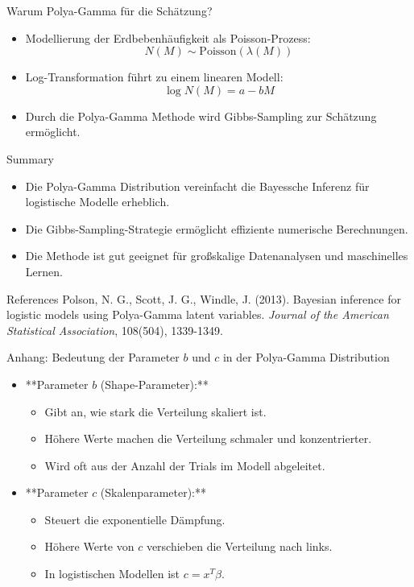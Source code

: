 \documentclass{beamer}
\begin{document}
	
	\begin{frame}{Warum Polya-Gamma für die Schätzung?}
		\begin{itemize}
			\item Modellierung der Erdbebenhäufigkeit als Poisson-Prozess:
			\[ N(M) \sim \text{Poisson}(\lambda(M)) \]
			\item Log-Transformation führt zu einem linearen Modell:
			\[ \log N(M) = a - bM \]
			\item Durch die Polya-Gamma Methode wird Gibbs-Sampling zur Schätzung ermöglicht.
		\end{itemize}
	\end{frame}
	
	
	
	
	\begin{frame}{Summary}
		\begin{itemize}
			\item Die Polya-Gamma Distribution vereinfacht die Bayessche Inferenz für logistische Modelle erheblich.
			\item Die Gibbs-Sampling-Strategie ermöglicht effiziente numerische Berechnungen.
			\item Die Methode ist gut geeignet für großskalige Datenanalysen und maschinelles Lernen.
		\end{itemize}
	\end{frame}
	




	\begin{frame}{References}
		Polson, N. G., Scott, J. G.,  Windle, J. (2013). Bayesian inference for logistic models using Polya-Gamma latent variables. \textit{Journal of the American Statistical Association}, 108(504), 1339-1349.
	\end{frame}


\begin{frame}{Anhang: Bedeutung der Parameter $b$ und $c$ in der Polya-Gamma Distribution}
	\begin{itemize}
		\item **Parameter $b$ (Shape-Parameter):**
		\begin{itemize}
			\item Gibt an, wie stark die Verteilung skaliert ist.
			\item Höhere Werte machen die Verteilung schmaler und konzentrierter.
			\item Wird oft aus der Anzahl der Trials im Modell abgeleitet.
		\end{itemize}
		\item **Parameter $c$ (Skalenparameter):**
		\begin{itemize}
			\item Steuert die exponentielle Dämpfung.
			\item Höhere Werte von $c$ verschieben die Verteilung nach links.
			\item In logistischen Modellen ist $c = x^T \beta$.
		\end{itemize}
	\end{itemize}
\end{frame}
\end{document}
